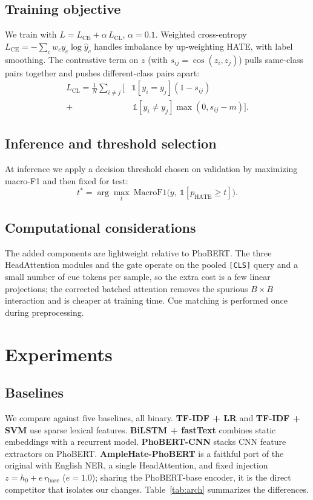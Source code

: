\documentclass[11pt]{article}
\begin{document}
\subsection{Training objective}
We train with $L = L_{\mathrm{CE}} + \alpha\,L_{\mathrm{CL}}$, $\alpha=0.1$. Weighted cross-entropy $L_{\mathrm{CE}}=-\sum_c w_c y_c\log\hat y_c$ handles imbalance by up-weighting HATE, with label smoothing. The contrastive term on $z$ (with $s_{ij}=\cos(z_i,z_j)$) pulls same-class pairs together and pushes different-class pairs apart:
\begin{equation}
\begin{split}
  L_{\mathrm{CL}} = \frac{1}{N}\sum_{i\neq j}\big[&\mathbb{1}[y_i{=}y_j](1-s_{ij}) \\[-2pt]
   + &\,\mathbb{1}[y_i{\neq}y_j]\max(0, s_{ij}-m)\big].
\end{split}
\end{equation}

\subsection{Inference and threshold selection}
At inference we apply a decision threshold chosen on validation by maximizing macro-F1 and then fixed for test:
\begin{equation}
  t^{*} = \arg\max_t\ \mathrm{MacroF1}\big(y,\ \mathbb{1}[p_{\mathrm{HATE}}\ge t]\big).
\end{equation}

\subsection{Computational considerations}
The added components are lightweight relative to PhoBERT. The three HeadAttention modules and the gate operate on the pooled \texttt{[CLS]} query and a small number of cue tokens per sample, so the extra cost is a few linear projections; the corrected batched attention removes the spurious $B\times B$ interaction and is cheaper at training time. Cue matching is performed once during preprocessing.

\section{Experiments}

\subsection{Baselines}
We compare against five baselines, all binary. \textbf{TF-IDF + LR} and \textbf{TF-IDF + SVM} use sparse lexical features. \textbf{BiLSTM + fastText} \citep{fasttext} combines static embeddings with a recurrent model. \textbf{PhoBERT-CNN} stacks CNN feature extractors on PhoBERT. \textbf{AmpleHate-PhoBERT} is a faithful port of the original with English NER, a single HeadAttention, and fixed injection $z=h_0+e\,r_{\mathrm{base}}$ ($e=1.0$); sharing the PhoBERT-base encoder, it is the direct competitor that isolates our changes. Table~\ref{tab:arch} summarizes the differences.
\end{document}
